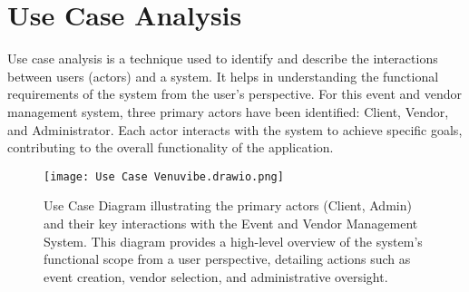 \documentclass{report}
\begin{document}
\section{Use Case Analysis}
\label{sec:use_case_analysis}
Use case analysis is a technique used to identify and describe the interactions between users (actors) and a system. It helps in understanding the functional requirements of the system from the user's perspective. For this event and vendor management system, three primary actors have been identified: Client, Vendor, and Administrator. Each actor interacts with the system to achieve specific goals, contributing to the overall functionality of the application.

\begin{figure}[htbp]
    \centering
    \texttt{[image: Use Case Venuvibe.drawio.png]} %
    \caption{Use Case Diagram illustrating the primary actors (Client, Admin) and their key interactions with the Event and Vendor Management System. This diagram provides a high-level overview of the system's functional scope from a user perspective, detailing actions such as event creation, vendor selection, and administrative oversight.}
    \label{fig:use_case_diagram}
\end{figure}
\end{document}
